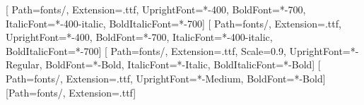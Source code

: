 %
%
%
%

\usepackage{fontspec}
\usepackage{amsmath}
\usepackage{xcolor}
\usepackage{fontawesome5}
\usepackage{tikz}
\usetikzlibrary{
  arrows.meta,
  backgrounds,
  calc,
  fit,
  positioning,
  shapes.geometric,
  shapes.misc,
}

\setmainfont{HankenGrotesk}[
  Path=fonts/, Extension=.ttf,
  UprightFont=*-400, BoldFont=*-700, ItalicFont=*-400-italic,
  BoldItalicFont=*-700]
\setsansfont{HankenGrotesk}[
  Path=fonts/, Extension=.ttf,
  UprightFont=*-400, BoldFont=*-700, ItalicFont=*-400-italic,
  BoldItalicFont=*-700]
\setmonofont{JetBrainsMono}[
  Path=fonts/, Extension=.ttf, Scale=0.9,
  UprightFont=*-Regular, BoldFont=*-Bold, ItalicFont=*-Italic,
  BoldItalicFont=*-Bold]
\newfontfamily{}[
  Path=fonts/, Extension=.ttf,
  UprightFont=*-Medium, BoldFont=*-Bold]
\newfontfamily{}[Path=fonts/, Extension=.ttf]



